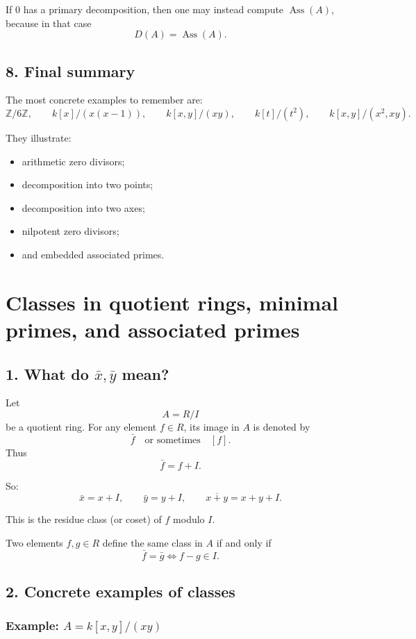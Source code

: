 \documentclass[12pt,a4paper,oneside]{report}
\DeclareMathOperator{\Ass}{Ass}
\theoremstyle{notespace}
\begin{document}
If \(0\) has a primary decomposition, then one may instead compute \(\Ass(A)\), because in that case
\[
D(A)=\Ass(A).
\]

\subsection{8. Final summary}

The most concrete examples to remember are:
\[
\mathbb Z/6\mathbb Z,\qquad
k[x]/(x(x-1)),\qquad
k[x,y]/(xy),\qquad
k[t]/(t^2),\qquad
k[x,y]/(x^2,xy).
\]

They illustrate:
\begin{itemize}
	\item arithmetic zero divisors;
	\item decomposition into two points;
	\item decomposition into two axes;
	\item nilpotent zero divisors;
	\item and embedded associated primes.
\end{itemize}

\section{Classes in quotient rings, minimal primes, and associated primes}

\subsection{1. What do \(\bar x,\bar y\) mean?}

Let
\[
A=R/I
\]
be a quotient ring. For any element \(f\in R\), its image in \(A\) is denoted by
\[
\bar f
\quad\text{or sometimes}\quad
[f].
\]
Thus
\[
\bar f=f+I.
\]

So:
\[
\bar x=x+I,\qquad \bar y=y+I,\qquad \overline{x+y}=x+y+I.
\]

This is the residue class (or coset) of \(f\) modulo \(I\).

Two elements \(f,g\in R\) define the same class in \(A\) if and only if
\[
\bar f=\bar g
\iff
f-g\in I.
\]

\subsection{2. Concrete examples of classes}

\subsubsection{Example: \(A=k[x,y]/(xy)\)}
\end{document}
